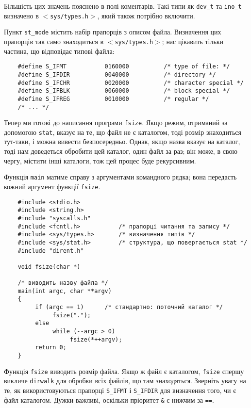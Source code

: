 \documentclass[a4paper,12pt]{book}
\begin{document}
  Більшість цих значень пояснено в полі коментарів. Такі типи як \texttt{dev\_t} та
  \texttt{ino\_t} визначено в \texttt{\mbox{$<$}sys/types.h\mbox{$>$}}, який також потрібно включити.

  Пункт \texttt{st\_mode} містить набір прапорців з описом файла. Визначення цих прапорців
  так само знаходиться в \texttt{\mbox{$<$}sys/types.h\mbox{$>$}}; нас цікавить тільки частина, що
  відповідає типові файла:
  \begin{verbatim}
    #define S_IFMT           0160000          /* type of file: */
    #define S_IFDIR          0040000          /* directory */
    #define S_IFCHR          0020000          /* character special */
    #define S_IFBLK          0060000          /* block special */
    #define S_IFREG          0010000          /* regular */
    /* ... */
  \end{verbatim}

  Тепер ми готові до написання програми \texttt{fsize}. Якщо режим, отриманий за допомогою
  \texttt{stat}, вказує на те, що файл не є каталогом, тоді розмір знаходиться тут-таки, і
  можна вивести безпосередньо. Однак, якщо назва вказує на каталог, тоді нам доведеться
  обробити цей каталог, один файл за раз; він може, в свою чергу, містити інші каталоги,
  тож цей процес буде рекурсивним.

  Функція \texttt{main} матиме справу з аргументами командного рядка; вона передасть
  кожний аргумент функції \texttt{fsize}.

  \begin{verbatim}
    #include <stdio.h>
    #include <string.h>
    #include "syscalls.h"
    #include <fcntl.h>           /* прапорці читання та запису */
    #include <sys/types.h>       /* визначення типів */
    #include <sys/stat.h>        /* структура, що повертається stat */
    #include "dirent.h"

    void fsize(char *)

    /* виводить назву файла */
    main(int argc, char **argv)
    {
         if (argc == 1)      /* стандартно: поточний каталог */
              fsize(".");
         else
              while (--argc > 0)
                   fsize(*++argv);
         return 0;
    }
  \end{verbatim}

  Функція \texttt{fsize} виводить розмір файла. Якщо ж файл є каталогом,
  \texttt{fsize} спершу викличе \texttt{dirwalk} для обробки всіх файлів, що там
  знаходяться. Зверніть увагу на те, як використовуються прапорці \texttt{S\_IFMT} і
  \texttt{S\_IFDIR} для визначення того, чи є файл каталогом. Дужки важливі,
  оскільки пріоритет \texttt{\&} є нижчим за \texttt{==}.
\end{document}
